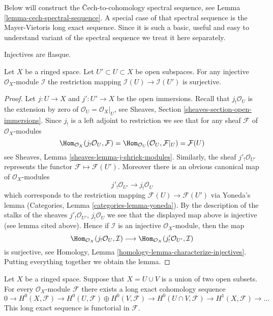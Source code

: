 \noindent
Below will construct the {\v C}ech-to-cohomology spectral sequence, see
Lemma \ref{lemma-cech-spectral-sequence}.
A special case of that spectral sequence is the Mayer-Vietoris
long exact sequence. Since it is such a basic, useful and easy to understand
variant of the spectral sequence we treat it here separately.

\begin{lemma}
\label{lemma-injective-restriction-surjective}
\begin{slogan}
Injectives are flasque.
\end{slogan}
Let $X$ be a ringed space.
Let $U' \subset U \subset X$ be open subspaces.
For any injective $\mathcal{O}_X$-module $\mathcal{I}$ the
restriction mapping
$\mathcal{I}(U) \to \mathcal{I}(U')$ is surjective.
\end{lemma}

\begin{proof}
Let $j : U \to X$ and $j' : U' \to X$ be the open immersions.
Recall that $j_!\mathcal{O}_U$ is the extension by zero of
$\mathcal{O}_U = \mathcal{O}_X|_U$, see
Sheaves, Section \ref{sheaves-section-open-immersions}.
Since $j_!$ is a left adjoint to restriction we see that
for any sheaf $\mathcal{F}$ of $\mathcal{O}_X$-modules
$$
\Hom_{\mathcal{O}_X}(j_!\mathcal{O}_U, \mathcal{F})
=
\Hom_{\mathcal{O}_U}(\mathcal{O}_U, \mathcal{F}|_U)
=
\mathcal{F}(U)
$$
see Sheaves, Lemma \ref{sheaves-lemma-j-shriek-modules}.
Similarly, the sheaf $j'_!\mathcal{O}_{U'}$ represents the
functor $\mathcal{F} \mapsto \mathcal{F}(U')$.
Moreover there
is an obvious canonical map of $\mathcal{O}_X$-modules
$$
j'_!\mathcal{O}_{U'} \longrightarrow j_!\mathcal{O}_U
$$
which corresponds to the restriction mapping
$\mathcal{F}(U) \to \mathcal{F}(U')$ via Yoneda's lemma
(Categories, Lemma \ref{categories-lemma-yoneda}). By the description
of the stalks of the sheaves
$j'_!\mathcal{O}_{U'}$, $j_!\mathcal{O}_U$
we see that the displayed map above is injective (see lemma cited above).
Hence if $\mathcal{I}$ is an injective $\mathcal{O}_X$-module,
then the map
$$
\Hom_{\mathcal{O}_X}(j_!\mathcal{O}_U, \mathcal{I})
\longrightarrow
\Hom_{\mathcal{O}_X}(j'_!\mathcal{O}_{U'}, \mathcal{I})
$$
is surjective, see
Homology, Lemma \ref{homology-lemma-characterize-injectives}.
Putting everything together we obtain the lemma.
\end{proof}

\begin{lemma}
\label{lemma-mayer-vietoris}
Let $X$ be a ringed space. Suppose that $X = U \cup V$ is a
union of two open subsets. For every $\mathcal{O}_X$-module $\mathcal{F}$
there exists a long exact cohomology sequence
$$
0 \to
H^0(X, \mathcal{F}) \to
H^0(U, \mathcal{F}) \oplus H^0(V, \mathcal{F}) \to
H^0(U \cap V, \mathcal{F}) \to
H^1(X, \mathcal{F}) \to \ldots
$$
This long exact sequence is functorial in $\mathcal{F}$.
\end{lemma}

